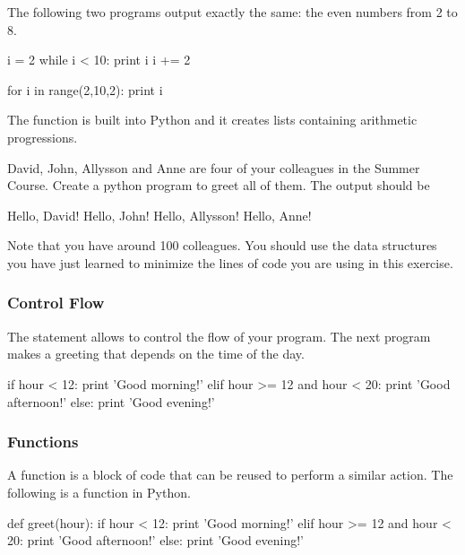 The following two programs output exactly the same: the even numbers from 2 to
8.


\begin{python}
i = 2
while i < 10:
  print i  
  i += 2 
\end{python}

\begin{python}
for i in range(2,10,2):
    print i
\end{python}

The  function is built into Python and it creates lists
containing arithmetic progressions. 

\begin{exercise}
David, John, Allysson and Anne are four of your colleagues in the Summer Course. Create a python program to greet all of them. The output should be\\
\begin{python} 
Hello, David!
Hello, John!
Hello, Allysson!
Hello, Anne!
\end{python}
Note that you have around 100 colleagues. You should use the data structures you have just learned to minimize the lines of code you are using in this exercise.
\end{exercise}


\subsubsection{Control Flow}

The  statement allows to control the flow of your program. The next
program makes a greeting that depends on the time of the day.

\begin{python}
if hour < 12:
    print 'Good morning!'
elif hour >= 12 and hour < 20:
    print 'Good afternoon!'
else:
    print 'Good evening!'
\end{python}

 
\subsubsection{Functions}

A function is a block of code that can be reused to perform a similar action. The following is a function in Python. 

\begin{python}
def greet(hour):
    if hour < 12:
        print 'Good morning!'
    elif hour >= 12 and hour < 20:
        print 'Good afternoon!'
    else:
        print 'Good evening!'
\end{python}

